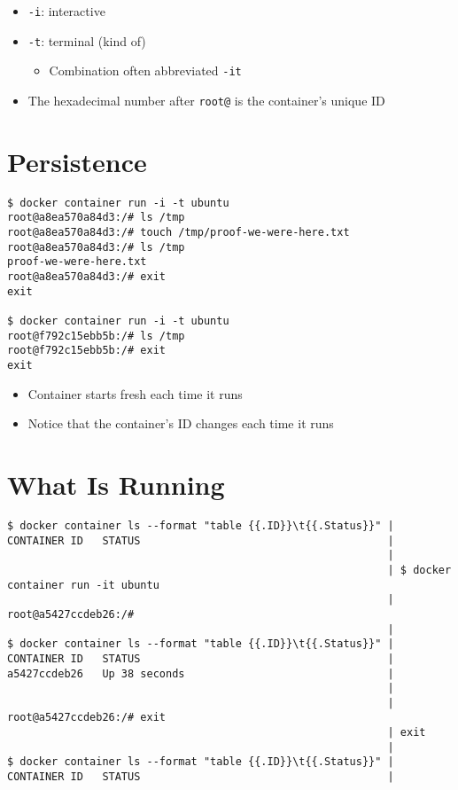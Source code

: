 \documentclass[krantzl]{krantz}
\begin{document}
\begin{itemize}
\item \texttt{-i}: interactive

\item \texttt{-t}: terminal (kind of)\begin{itemize}
\item Combination often abbreviated \texttt{-it}

\end{itemize}


\item The hexadecimal number after \texttt{root@} is the container’s unique ID

\end{itemize}
\section{Persistence}
\begin{lstlisting}[frame=tblr,backgroundcolor=\color{black!5}]
$ docker container run -i -t ubuntu
root@a8ea570a84d3:/# ls /tmp
root@a8ea570a84d3:/# touch /tmp/proof-we-were-here.txt
root@a8ea570a84d3:/# ls /tmp
proof-we-were-here.txt
root@a8ea570a84d3:/# exit
exit

$ docker container run -i -t ubuntu
root@f792c15ebb5b:/# ls /tmp
root@f792c15ebb5b:/# exit
exit
\end{lstlisting}

\begin{itemize}
\item Container starts fresh each time it runs

\item Notice that the container’s ID changes each time it runs

\end{itemize}
\section{What Is Running}
\begin{lstlisting}[frame=tblr,backgroundcolor=\color{black!5}]
$ docker container ls --format "table {{.ID}}\t{{.Status}}" |
CONTAINER ID   STATUS                                       |
                                                            |
                                                            | $ docker container run -it ubuntu
                                                            | root@a5427ccdeb26:/#
                                                            |
$ docker container ls --format "table {{.ID}}\t{{.Status}}" |
CONTAINER ID   STATUS                                       |
a5427ccdeb26   Up 38 seconds                                |
                                                            |
                                                            | root@a5427ccdeb26:/# exit
                                                            | exit
                                                            |
$ docker container ls --format "table {{.ID}}\t{{.Status}}" |
CONTAINER ID   STATUS                                       |
\end{lstlisting}
\end{document}
